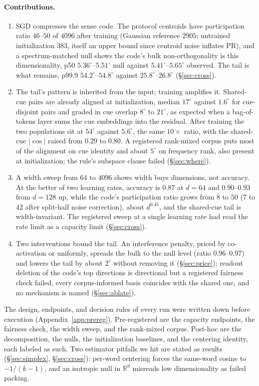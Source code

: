 \documentclass{article}
\newcommand{\degr}{^{\circ}}
\begin{document}
\paragraph{Contributions.}
\begin{enumerate}[leftmargin=*,itemsep=1pt,topsep=2pt]
  \item SGD compresses the sense code. The protocol centroids have participation
    ratio $46$--$50$ of $4096$ after training (Gaussian reference $2905$; untrained
    initialization $383$, itself an upper bound since centroid noise inflates PR), and
    a spectrum-matched null shows the code's bulk non-orthogonality is this
    dimensionality, p50 $5.36\degr$--$5.51\degr$ null against
    $5.41\degr$--$5.65\degr$ observed. The tail is what remains, p99.9
    $54.2\degr$--$54.8\degr$ against $25.8\degr$--$26.8\degr$ (\S\ref{sec:cross}).
  \item The tail's pattern is inherited from the input; training amplifies it.
    Shared-cue pairs are already aligned at initialization, median $17\degr$
    against $1.6\degr$ for cue-disjoint pairs and graded in cue overlap $8\degr$ to
    $21\degr$, as expected when a bag-of-tokens layer sums the cue embeddings into
    the residual. After training the two populations sit at $54\degr$ against
    $5.6\degr$, the same $10\times$ ratio, with the shared-cue $|\cos|$ raised from
    $0.29$ to $0.80$. A registered rank-mixed corpus puts most of the alignment on
    cue identity and about $5\degr$ on frequency rank, also present at
    initialization; the rule's subspace clause failed (\S\ref{sec:where}).
  \item A width sweep from $64$ to $4096$ shows width buys dimensions, not
    accuracy. At the better of two learning rates, accuracy is $0.87$ at $d{=}64$
    and $0.90$--$0.93$ from $d{=}128$ up, while the code's participation ratio
    grows from $8$ to $50$ ($7$ to $42$ after split-half noise correction), about
    $d^{0.45}$, and the shared-cue tail is width-invariant. The registered sweep
    at a single learning rate had read the rate limit as a capacity limit
    (\S\ref{sec:cross}).
  \item Two interventions bound the tail. An interference penalty, priced by
    co-activation or uniformly, spreads the bulk to the null level (ratio
    $0.96$--$0.97$) and lowers the tail by about $2\degr$ without removing it
    (\S\ref{sec:price}); readout deletion of the code's top directions is
    directional but a registered fairness check failed, every corpus-informed basis
    coincides with the shared one, and no mechanism is named (\S\ref{sec:ablate}).
\end{enumerate}
The design, endpoints, and decision rules of every run were written down before
execution (Appendix~\ref{app:prereg}). Pre-registered are the capacity endpoints,
the fairness check, the width sweep, and the rank-mixed corpus. Post-hoc are the
decomposition, the nulls, the initialization baselines, and the centering
identity, each labeled as such. Two estimator pitfalls we hit are stated as
results (\S\ref{sec:simplex}, \S\ref{sec:cross}): per-word centering forces the
same-word cosine to $-1/(k{-}1)$, and an isotropic null in $\mathbb{R}^d$ misreads
low dimensionality as failed packing.
\end{document}
